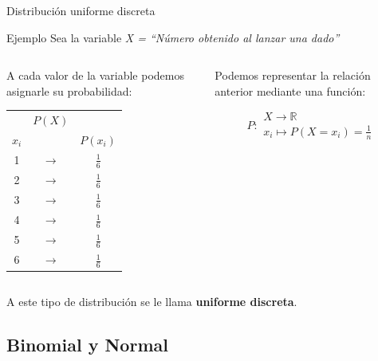 \documentclass[11pt,handout]{beamer}
\begin{document}
\begin{frame}
{Distribución uniforme discreta}
\begin{block}{Ejemplo}
Sea la variable \emph{X = “Número obtenido al lanzar una dado”}
\end{block}
\pause
\begin{columns}
\begin{column}{0.5 \textwidth}
A cada valor de la variable podemos asignarle su probabilidad:
\begin{center}
\begin{tabular}{ccc}
 & $P(X)$ &  \\
$x_i$ &  &  $P(x_i)$\\ \hline 
1 & $\rightarrow$ & $\tfrac{1}{6}$ \\ 
2 & $\rightarrow$ & $\tfrac{1}{6}$ \\ 
3 & $\rightarrow$ & $\tfrac{1}{6}$ \\ 
4 & $\rightarrow$ & $\tfrac{1}{6}$ \\ 
5 & $\rightarrow$ & $\tfrac{1}{6}$ \\ 
6 & $\rightarrow$ & $\tfrac{1}{6}$ \\ 
\end{tabular} 
\end{center}
\end{column}
\pause
\begin{column}{0.5 \textwidth}
 Podemos representar la relación anterior mediante una función:

$$P\colon \begin{array}{ll} 
          X \rightarrow \mathbb{R} \\ 
          x_i\mapsto P(X=x_i)=\frac{1}{n} 
         \end{array}$$
\end{column}
\end{columns}

\pause
A este tipo de distribución se le llama \textbf{uniforme discreta}.
\end{frame}

\subsection{Binomial y Normal}
\end{document}

